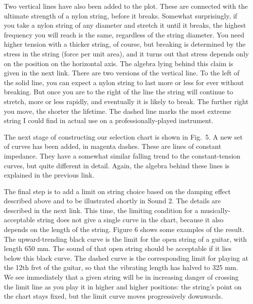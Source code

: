 
  Two vertical lines have also been added to the plot. These are connected with 
  the ultimate strength of a nylon string, before it breaks. Somewhat 
  surprisingly, if you take a nylon string of any diameter and stretch it until 
  it breaks, the highest frequency you will reach is the same, regardless of 
  the string diameter. You need higher tension with a thicker string, of 
  course, but breaking is determined by the stress in the string (force per 
  unit area), and it turns out that stress depends only on the position on the 
  horizontal axis. The algebra lying behind this claim is given in the next 
  link. There are two versions of the vertical line. To the left of the solid 
  line, you can expect a nylon string to last more or less for ever without 
  breaking. But once you are to the right of the line the string will continue 
  to stretch, more or less rapidly, and eventually it is likely to break. The 
  further right you move, the shorter the lifetime. The dashed line marks the 
  most extreme string I could find in actual use on a professionally-played 
  instrument. 

  The next stage of constructing our selection chart is shown in Fig.\ 5. A new 
  set of curves has been added, in magenta dashes. These are lines of constant 
  impedance. They have a somewhat similar falling trend to the constant-tension 
  curves, but quite different in detail. Again, the algebra behind these lines 
  is explained in the previous link. 


  The final step is to add a limit on string choice based on the damping effect 
  described above and to be illustrated shortly in Sound 2. The details are 
  described in the next link. This time, the limiting condition for a 
  musically-acceptable string does not give a single curve in the chart, 
  because it also depends on the length of the string. Figure 6 shows some 
  examples of the result. The upward-trending black curve is the limit for the 
  open string of a guitar, with length 650 mm. The sound of that open string 
  should be acceptable if it lies below this black curve. The dashed curve is 
  the corresponding limit for playing at the 12th fret of the guitar, so that 
  the vibrating length has halved to 325 mm. We see immediately that a given 
  string will be in increasing danger of crossing the limit line as you play it 
  in higher and higher positions: the string's point on the chart stays fixed, 
  but the limit curve moves progressively downwards. 

